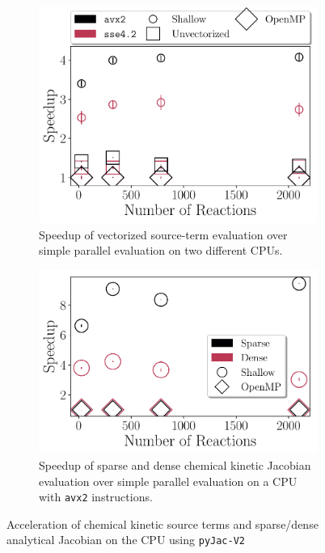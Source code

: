 \documentclass[a4paper,10pt]{article}
\def\avx/{\texttt{avx2}}
\begin{document}
\begin{figure}[!htb]
  \begin{subfigure}[t]{0.45\textwidth}
   \includegraphics[width=\textwidth]{intel_source.pdf}
   \caption{Speedup of vectorized source-term evaluation over simple parallel evaluation on two different CPUs.}
   \label{F:source}
  \end{subfigure}%
  \qquad
  \begin{subfigure}[t]{0.45\textwidth}
   \includegraphics[width=\textwidth]{sparse_vs_dense_speedup.pdf}
   \caption{Speedup of sparse and dense chemical kinetic Jacobian evaluation over simple parallel evaluation on a CPU with \avx/ instructions.}
   \label{F:jac}
  \end{subfigure}
  \caption{Acceleration of chemical kinetic source terms and sparse\slash dense analytical Jacobian on the CPU using \texttt{pyJac-V2}}
\end{figure}
\end{document}
